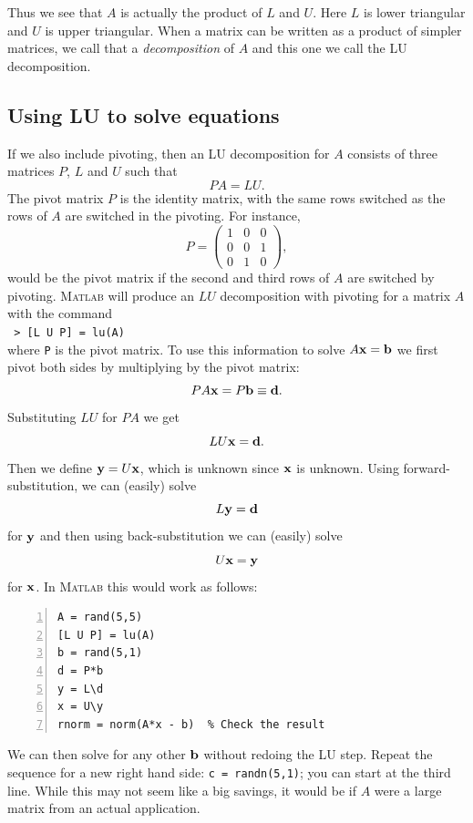 Thus we see that $A$ is actually the product of $L$ and $U$.
Here $L$ is lower triangular and $U$ is upper triangular.
When a matrix can be written as a product of simpler
matrices, we call that a {\em decomposition} of $A$ and
this one we call the LU decomposition.


\subsection*{Using LU to solve equations}

If we also include pivoting, then an LU decomposition for $A$
consists of three matrices $P$, $L$ and $U$ such that
\begin{equation}\label{LUP}
   PA = LU.
\end{equation}
The pivot matrix $P$ is the identity matrix, with the same rows switched
as the rows of $A$ are switched in the pivoting. For instance,
$$
P = \left(\begin{array}{ccc}
        1 & 0 & 0 \\
        0 & 0 & 1  \\
        0 & 1 & 0
      \end{array}\right),
$$
would be the pivot matrix if the second and third rows of $A$ are
switched by pivoting.  \textsc{Matlab} will produce an $LU$
decomposition with pivoting for a matrix $A$
with the command\\
\verb& > [L U P] = lu(A)&\\
where \verb&P& is the pivot matrix. To use this information to solve
$A \mathbf{x} = \mathbf{b}$ we first pivot both sides by multiplying by the pivot
matrix:
$$
     PA \mathbf{x} = P \mathbf{b} \equiv \mathbf{d}.
$$
Substituting $LU$ for $PA$ we get
$$
     LU \mathbf{x} = \mathbf{d} .
$$
Then we define $\mathbf{y}=U \mathbf{x}$, which is unknown since \(\mathbf{x}\) is unknown. 
Using forward-substitution, we can (easily) solve
$$
     L \mathbf{y} = \mathbf{d}
$$
for \(\mathbf{y}\) and then using back-substitution we can (easily) solve 
$$
     U \mathbf{x} = \mathbf{y}
$$
for \(\mathbf{x}\).
In \textsc{Matlab} this would work as follows:
\begin{lstlisting}[frame=none,numbers=left]
A = rand(5,5)
[L U P] = lu(A)
b = rand(5,1)
d = P*b
y = L\d
x = U\y
rnorm = norm(A*x - b)  % Check the result
\end{lstlisting}
We can then solve for any other $\mathbf{b}$ without redoing the LU step.
Repeat the sequence for a new right hand side: \verb&c = randn(5,1)&;
you can start at the third line.
While this may not seem like a big savings, it would be if $A$ were a large
matrix from an actual application.


